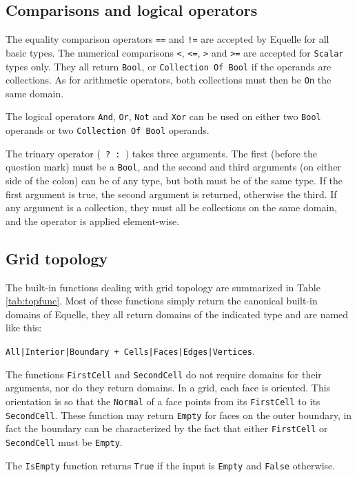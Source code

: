 \documentclass[11pt]{article}
\newcommand{\code}[1]{\texttt{#1}}
\begin{document}
\subsection{Comparisons and logical operators}

The equality comparison operators \code{==} and \code{!=} are accepted by Equelle for all
basic types. The numerical comparisons \code{<}, \code{<=}, \code{>} and \code{>=} are
accepted for \code{Scalar} types only. They all return \code{Bool}, or \code{Collection Of
Bool} if the operands are collections. As for arithmetic operators, both collections must
then be \code{On} the same domain.

The logical operators \code{And}, \code{Or}, \code{Not} and \code{Xor} can be used on
either two \code{Bool} operands or two \code{Collection Of Bool} operands.

The trinary operator (\code{ ? : }) takes three arguments. The first (before the question
mark) must be a \code{Bool}, and the second and third arguments (on either side of the
colon) can be of any type, but both must be of the same type. If the first argument is
true, the second argument is returned, otherwise the third. If any argument is a
collection, they must all be collections on the same domain, and the operator is applied
element-wise.

\subsection{Grid topology}

The built-in functions dealing with grid topology are summarized in Table
\ref{tab:topfunc}. Most of these functions simply return the canonical built-in domains of
Equelle, they all return domains of the indicated type and are named like this:

\code{All|Interior|Boundary + Cells|Faces|Edges|Vertices}.

The functions \code{FirstCell} and \code{SecondCell} do not require domains for their
arguments, nor do they return domains. In a grid, each face is oriented. This orientation
is so that the \code{Normal} of a face points from its \code{FirstCell} to its
\code{SecondCell}. These function may return \code{Empty} for faces on the outer boundary,
in fact the boundary can be characterized by the fact that either \code{FirstCell} or
\code{SecondCell} must be \code{Empty}.

The \code{IsEmpty} function returns \code{True} if the input is \code{Empty} and
\code{False} otherwise.
\end{document}
